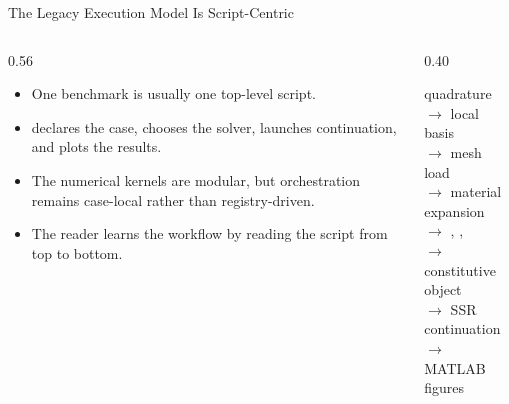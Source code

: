 \documentclass[aspectratio=169,10pt]{beamer}
\begin{document}
\begin{frame}{The Legacy Execution Model Is Script-Centric}
\small
\begin{columns}[T,totalwidth=\textwidth]
\begin{column}{0.56\textwidth}
\begin{softbox}
\begin{itemize}
  \item One benchmark is usually one top-level script.
  \item {} declares the case, chooses the solver, launches continuation, and plots the results.
  \item The numerical kernels are modular, but orchestration remains case-local rather than registry-driven.
  \item The reader learns the workflow by reading the script from top to bottom.
\end{itemize}
\end{softbox}
\end{column}
\begin{column}{0.40\textwidth}
\begin{pseudobox}
quadrature\\
$\rightarrow$ local basis\\
$\rightarrow$ mesh load\\
$\rightarrow$ material expansion\\
$\rightarrow$ , , \\
$\rightarrow$ constitutive object\\
$\rightarrow$ SSR continuation\\
$\rightarrow$ MATLAB figures
\end{pseudobox}
\end{column}
\end{columns}
\end{frame}
\end{document}
